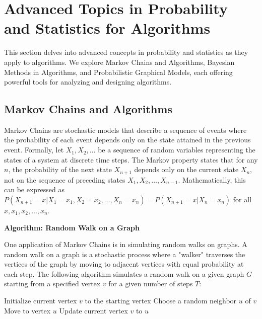 \documentclass[12pt]{book} %
\begin{document}
\section{Advanced Topics in Probability and Statistics for Algorithms}
This section delves into advanced concepts in probability and statistics as they apply to algorithms. We explore Markov Chains and Algorithms, Bayesian Methods in Algorithms, and Probabilistic Graphical Models, each offering powerful tools for analyzing and designing algorithms.

\subsection{Markov Chains and Algorithms}
Markov Chains are stochastic models that describe a sequence of events where the probability of each event depends only on the state attained in the previous event. Formally, let \(X_1, X_2, \ldots\) be a sequence of random variables representing the states of a system at discrete time steps. The Markov property states that for any \(n\), the probability of the next state \(X_{n+1}\) depends only on the current state \(X_n\), not on the sequence of preceding states \(X_1, X_2, \ldots, X_{n-1}\). Mathematically, this can be expressed as \(P(X_{n+1} = x | X_1 = x_1, X_2 = x_2, \ldots, X_n = x_n) = P(X_{n+1} = x | X_n = x_n)\) for all \(x, x_1, x_2, \ldots, x_n\).

\textbf{Algorithm: Random Walk on a Graph}

One application of Markov Chains is in simulating random walks on graphs. A random walk on a graph is a stochastic process where a "walker" traverses the vertices of the graph by moving to adjacent vertices with equal probability at each step. The following algorithm simulates a random walk on a given graph \(G\) starting from a specified vertex \(v\) for a given number of steps \(T\):
\FloatBarrier
\begin{algorithm}[H]
\caption{Random Walk on a Graph}
\begin{algorithmic}[1]
\State Initialize current vertex $v$ to the starting vertex
    \State Choose a random neighbor $u$ of $v$
    \State Move to vertex $u$
    \State Update current vertex $v$ to $u$
\EndFor
\end{algorithmic}
\end{algorithm}
\end{document}
